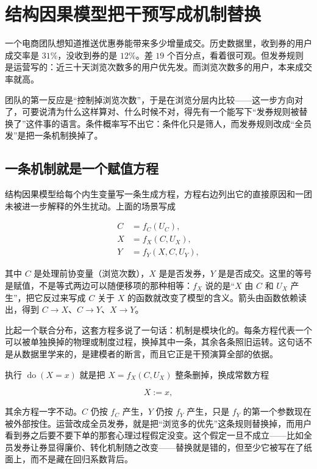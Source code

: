 \section{结构因果模型把干预写成机制替换}
\label{sec:13-Machine-Learning/12-Causal-Inference/02}

一个电商团队想知道推送优惠券能带来多少增量成交。历史数据里，收到券的用户成交率是 \(31\%\)，没收到券的是 \(12\%\)。差 \(19\) 个百分点，看着很可观。但发券规则是运营写的：近三十天浏览次数多的用户优先发。而浏览次数多的用户，本来成交率就高。

团队的第一反应是``控制掉浏览次数''，于是在浏览分层内比较——这一步方向对了，可要说清为什么这样算对、什么时候不对，得先有一个能写下``发券规则被替换了''这件事的语言。条件概率写不出它：条件化只是筛人，而发券规则改成``全员发''是把一条机制换掉了。

\subsection{一条机制就是一个赋值方程}

结构因果模型给每个内生变量写一条生成方程，方程右边列出它的直接原因和一团未被进一步解释的外生扰动。上面的场景写成

\[
\begin{aligned}
C &= f_C(U_C),\\
X &= f_X(C,U_X),\\
Y &= f_Y(X,C,U_Y),
\end{aligned}
\]

其中 \(C\) 是处理前协变量（浏览次数），\(X\) 是是否发券，\(Y\) 是是否成交。这里的等号是赋值，不是等式两边可以随便移项的那种相等：\(f_X\) 说的是``\(X\) 由 \(C\) 和 \(U_X\) 产生''，把它反过来写成 \(C\) 关于 \(X\) 的函数就改变了模型的含义。箭头由函数依赖读出，得到 \(C\to X\)、\(C\to Y\)、\(X\to Y\)。

比起一个联合分布，这套方程多说了一句话：机制是模块化的。每条方程代表一个可以被单独换掉的物理或制度过程，换掉其中一条，其余各条照旧运转。这句话不是从数据里学来的，是建模者的断言，而且它正是干预演算全部的依据。

执行 \(\operatorname{do}(X=x)\) 就是把 \(X=f_X(C,U_X)\) 整条删掉，换成常数方程

\[
X:=x,
\]

其余方程一字不动。\(C\) 仍按 \(f_C\) 产生，\(Y\) 仍按 \(f_Y\) 产生，只是 \(f_Y\) 的第一个参数现在被外部按住。运营改成全员发券，就是把``浏览多的优先''这条规则替换掉，而用户看到券之后要不要下单的那套心理过程假定没变。这个假定一旦不成立——比如全员发券让券显得廉价、转化机制随之改变——替换就是错的，但至少它被写在了纸面上，而不是藏在回归系数背后。

